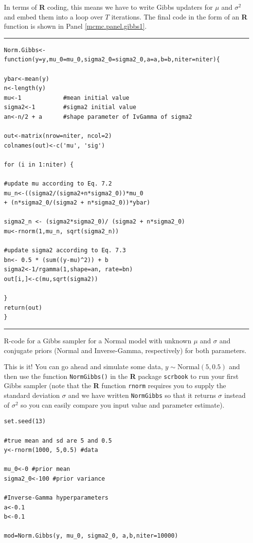 In terms of {\bf R} coding, this means we have to write Gibbs updaters for
$\mu$ and $\sigma^2$ and embed them into a loop over $T$ iterations. The final
code in the form of an {\bf R} function is shown 
in Panel \ref{mcmc.panel.gibbs1}.
\begin{panel}[ht]
\centering
\rule[0.15in]{\textwidth}{.03in}
{\small
\begin{verbatim}
Norm.Gibbs<-function(y=y,mu_0=mu_0,sigma2_0=sigma2_0,a=a,b=b,niter=niter){

ybar<-mean(y)
n<-length(y)
mu<-1            #mean initial value
sigma2<-1        #sigma2 initial value
an<-n/2 + a      #shape parameter of IvGamma of sigma2

out<-matrix(nrow=niter, ncol=2)
colnames(out)<-c('mu', 'sig')

for (i in 1:niter) {

#update mu according to Eq. 7.2
mu_n<-((sigma2/(sigma2+n*sigma2_0))*mu_0 
+ (n*sigma2_0/(sigma2 + n*sigma2_0))*ybar)
		
sigma2_n <- (sigma2*sigma2_0)/ (sigma2 + n*sigma2_0)
mu<-rnorm(1,mu_n, sqrt(sigma2_n))

#update sigma2 according to Eq. 7.3
bn<- 0.5 * (sum((y-mu)^2)) + b
sigma2<-1/rgamma(1,shape=an, rate=bn)
out[i,]<-c(mu,sqrt(sigma2))

}
return(out)
}
\end{verbatim}
}
\rule[-0.15in]{\textwidth}{.03in}
\caption{
R-code for a Gibbs sampler for a Normal model with unknown $\mu$
and $\sigma$ and conjugate priors (Normal and Inverse-Gamma, respectively) 
for both parameters.
}
\label{mcmc.panel.gibbs1}
\end{panel}

This is it! You can go ahead and simulate some data, $y \sim \mbox{Normal}(5, 0.5)$ and then use the function \mbox{\tt NormGibbs()} in the {\bf R} package \mbox{\tt scrbook} to run your first Gibbs sampler (note that the {\bf R} function {\tt rnorm} requires you to supply the standard deviation $\sigma$ and we have written {\tt NormGibbs} so that it returns $\sigma$ instead of $\sigma^2$ so you can easily compare you input value and parameter estimate). 

\begin{verbatim}
set.seed(13)

#true mean and sd are 5 and 0.5
y<-rnorm(1000, 5,0.5) #data

mu_0<-0 #prior mean
sigma2_0<-100 #prior variance 

#Inverse-Gamma hyperparameters
a<-0.1
b<-0.1 

mod=Norm.Gibbs(y, mu_0, sigma2_0, a,b,niter=10000)
\end{verbatim}

